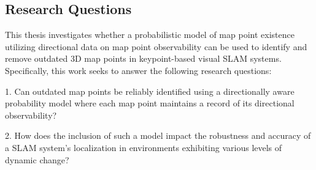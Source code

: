 \subsection{Research Questions}




This thesis investigates whether a probabilistic model of map point existence utilizing directional data on map point observability can be used to identify and remove outdated 3D map points in keypoint-based visual SLAM systems. Specifically, this work seeks to answer the following research questions:

1. Can outdated map points be reliably identified using a directionally aware probability model where each map point maintains a record of its directional observability?

2. How does the inclusion of such a model impact the robustness and accuracy of a SLAM system's localization in environments exhibiting various levels of dynamic change?